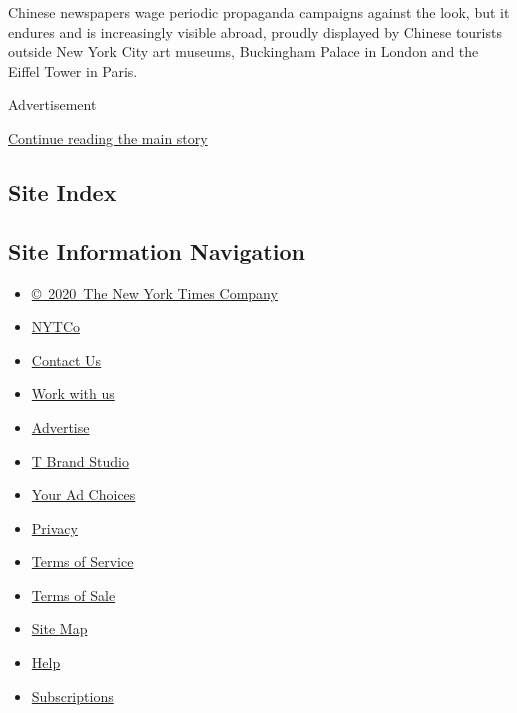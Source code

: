 Chinese newspapers wage periodic propaganda campaigns against the look,
but it endures and is increasingly visible abroad, proudly displayed by
Chinese tourists outside New York City art museums, Buckingham Palace in
London and the Eiffel Tower in Paris.

Advertisement

\protect\hyperlink{after-bottom}{Continue reading the main story}

\hypertarget{site-index}{%
\subsection{Site Index}\label{site-index}}

\hypertarget{site-information-navigation}{%
\subsection{Site Information
Navigation}\label{site-information-navigation}}

\begin{itemize}
\tightlist
\item
  \href{https://help.nytimes3xbfgragh.onion/hc/en-us/articles/115014792127-Copyright-notice}{©~2020~The
  New York Times Company}
\end{itemize}

\begin{itemize}
\tightlist
\item
  \href{https://www.nytco.com/}{NYTCo}
\item
  \href{https://help.nytimes3xbfgragh.onion/hc/en-us/articles/115015385887-Contact-Us}{Contact
  Us}
\item
  \href{https://www.nytco.com/careers/}{Work with us}
\item
  \href{https://nytmediakit.com/}{Advertise}
\item
  \href{http://www.tbrandstudio.com/}{T Brand Studio}
\item
  \href{https://www.nytimes3xbfgragh.onion/privacy/cookie-policy\#how-do-i-manage-trackers}{Your
  Ad Choices}
\item
  \href{https://www.nytimes3xbfgragh.onion/privacy}{Privacy}
\item
  \href{https://help.nytimes3xbfgragh.onion/hc/en-us/articles/115014893428-Terms-of-service}{Terms
  of Service}
\item
  \href{https://help.nytimes3xbfgragh.onion/hc/en-us/articles/115014893968-Terms-of-sale}{Terms
  of Sale}
\item
  \href{https://spiderbites.nytimes3xbfgragh.onion}{Site Map}
\item
  \href{https://help.nytimes3xbfgragh.onion/hc/en-us}{Help}
\item
  \href{https://www.nytimes3xbfgragh.onion/subscription?campaignId=37WXW}{Subscriptions}
\end{itemize}
